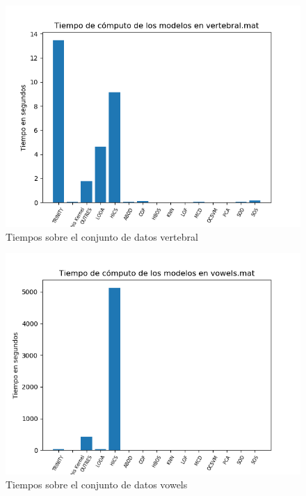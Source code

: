 \begin{figure}[H]
	\centering
	\includegraphics[scale=0.7]{imagenes/imgs-exp1/times/vertebral}
	\caption{Tiempos sobre el conjunto de datos vertebral}
	\label{vertebral_times}
\end{figure}

\begin{figure}[H]
	\centering
	\includegraphics[scale=0.7]{imagenes/imgs-exp1/times/vowels}
	\caption{Tiempos sobre el conjunto de datos vowels}
	\label{vowels_times}
\end{figure}

